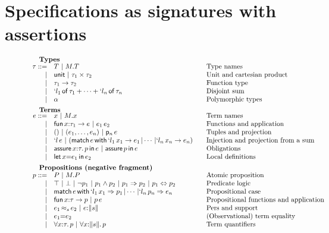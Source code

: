 \section{Specifications as signatures with assertions}
\label{sec:spec-sign-assert}

\begin{figure}
  \[
  \begin{array}{rl@{\qquad}l}
    \noalign{\textbf{Types}}
    \oty ::= 
    & \oTY  \obar \oselect{\oM}{\oTY} &\mbox{Type names}\\
    | & \ounit \obar \oprod{\oty_1}{\oty_2} &\mbox{Unit and cartesian product}\\
    | & \oarrow{\oty_1}{\oty_2} & \mbox{Function type}\\
    | & \osumty{\ol_1}{\oty_1}{\ol_n}{\oty_n} &\mbox{Disjoint sum}\\
    | & \opty & \mbox{Polymorphic types}\\[5pt]
    
    \noalign{\textbf{Terms}}	
    \oe ::=
    & \ox \obar \oselect{\oM}{\ox} &\mbox{Term names}\\
    | & \olambda{\ox}{\oty_1}{\oe} \obar 
    \oapp{\oe_1}{\oe_2} &\mbox{Functions and application}\\
    | & ()
    \obar \otuple{\oe_1}{\oe_n} 
    \obar \oproj{\oe}{n}&\mbox{Tuples and projection}\\
    | & \oinj{\ol}{\oe} 
    \obar (\omatches{\oe}{\ol_1}{\ox_1}{\oe_1}{\ol_n}{\ox_n}{\oe_n})&\mbox{Injection and projection from a sum}\\
    | & \ooblig{\ox}{\oty}{\op}{\oe} \obar \oobligx{\op}{\oe} &\mbox{Obligations}\\
    | & \olet{\ox}{\oe_1}{\oe_2}&\mbox{Local definitions}\\[5pt]
    

    \noalign{\textbf{Propositions (negative fragment)}}
    \op ::= 
    & \oP \obar \oselect{\oM}{\oP}&\mbox{Atomic
      proposition}\\
    | & \otrue  \obar \ofalse \obar \onot{\op_1} \obar \oand{\op_1}{\op_2} \obar 
    \oimply{\op_1}{\op_2} \obar \oiff{\op_1}{\op_2} & \mbox{Predicate logic}\\ 
    | & \opcases{\oe}{\ol_1}{\ox_1}{\op_1}{\ol_n}{\op_n}{\oe_n}&\mbox{Propositional case}\\
    | & \olambda{\ox}{\oty}{\op}  \obar \oapp{\op}{\oe} &
    \mbox{Propositional functions and application}\\
    | & \oper{\os}{\oe_1}{\oe_2} \obar \ototal{\oe}{\os} & \mbox{Pers and support} \\
    | & \oequal{\oe_1}{\oe_2} & \mbox{(Observational) term equality}\\
    | & \oforall{\ox}{\oty}{\op}  \obar 
    \oforallt{\ox}{\os}{\op} & \mbox{Term quantifiers}\\[5pt]
    

\end{array}\]
\end{figure}
